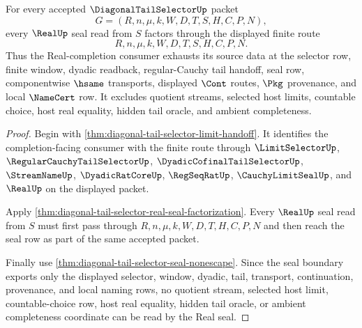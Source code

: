 \begin{theorem}
\label{thm:diagonal-tail-selector-real-seal-source-exhaustion}
For every accepted $\DiagonalTailSelectorUp$ packet
$$
G=(R,n,\mu,k,W,D,T,S,H,C,P,N),
$$
every $\RealUp$ seal read from $S$ factors through the displayed finite route
$$
R,n,\mu,k,W,D,T,S,H,C,P,N.
$$
Thus the Real-completion consumer exhausts its source data at the selector
row, finite window, dyadic readback, regular-Cauchy tail handoff, seal row,
componentwise $\hsame$ transports, displayed $\Cont$ routes, $\Pkg$
provenance, and local $\NameCert$ row. It excludes quotient streams, selected
host limits, countable choice, host real equality, hidden tail oracle, and
ambient completeness.
\end{theorem}
\begin{proof}
Begin with \autoref{thm:diagonal-tail-selector-limit-handoff}. It identifies
the completion-facing consumer with the finite route through
$\LimitSelectorUp$, $\RegularCauchyTailSelectorUp$,
$\DyadicCofinalTailSelectorUp$, $\StreamNameUp$, $\DyadicRatCoreUp$,
$\RegSeqRatUp$, $\CauchyLimitSealUp$, and $\RealUp$ on the displayed packet.

Apply \autoref{thm:diagonal-tail-selector-real-seal-factorization}. Every
$\RealUp$ seal read from $S$ must first pass through
$R,n,\mu,k,W,D,T,H,C,P,N$ and then reach the seal row as part of the same
accepted packet.

Finally use \autoref{thm:diagonal-tail-selector-seal-nonescape}. Since the
seal boundary exports only the displayed selector, window, dyadic, tail,
transport, continuation, provenance, and local naming rows, no quotient
stream, selected host limit, countable-choice row, host real equality, hidden
tail oracle, or ambient completeness coordinate can be read by the Real seal.
\end{proof}

